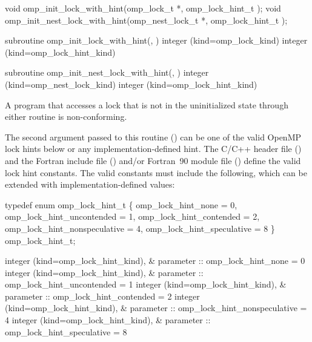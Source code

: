 \format
\ccppspecificstart
\begin{boxedcode}
void omp\_init\_lock\_with\_hint(omp\_lock\_t *, 
                             omp\_lock\_hint\_t );
void omp\_init\_nest\_lock\_with\_hint(omp\_nest\_lock\_t *, 
                                  omp\_lock\_hint\_t );
\end{boxedcode}
\ccppspecificend

\fortranspecificstart
\begin{boxedcode}
subroutine omp\_init\_lock\_with\_hint(, )
integer (kind=omp\_lock\_kind) 
integer (kind=omp\_lock\_hint\_kind) 

subroutine omp\_init\_nest\_lock\_with\_hint(, )
integer (kind=omp\_nest\_lock\_kind) 
integer (kind=omp\_lock\_hint\_kind) 
\end{boxedcode}
\fortranspecificend

\constraints
A program that accesses a lock that is not in the uninitialized state through either routine 
is non-conforming.

The second argument passed to this routine () can be one of the valid OpenMP lock hints below or any implementation-defined hint. 
The C/C++ header file () and the Fortran include file () and/or Fortran~90 module file () define the valid lock hint constants.  
The valid constants must include the following, which can be extended with implementation-defined values:

\ccppspecificstart
\begin{codepar}
typedef enum omp\_lock\_hint\_t \{
  omp\_lock\_hint\_none = 0,
  omp\_lock\_hint\_uncontended = 1,
  omp\_lock\_hint\_contended = 2,
  omp\_lock\_hint\_nonspeculative = 4,
  omp\_lock\_hint\_speculative = 8
\} omp\_lock\_hint\_t;
\end{codepar}
\ccppspecificend

\fortranspecificstart
\begin{codepar}
integer (kind=omp\_lock\_hint\_kind), &
        parameter :: omp\_lock\_hint\_none = 0
integer (kind=omp\_lock\_hint\_kind), &
        parameter :: omp\_lock\_hint\_uncontended = 1
integer (kind=omp\_lock\_hint\_kind), &
        parameter :: omp\_lock\_hint\_contended = 2
integer (kind=omp\_lock\_hint\_kind), &
        parameter :: omp\_lock\_hint\_nonspeculative = 4 
integer (kind=omp\_lock\_hint\_kind), &
        parameter :: omp\_lock\_hint\_speculative = 8
\end{codepar}
\fortranspecificend

